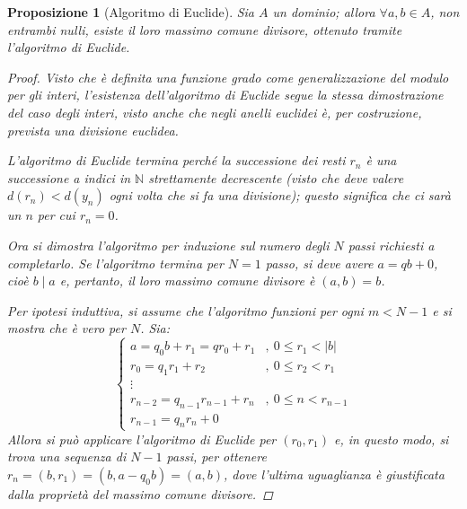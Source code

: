 \documentclass[12pt]{scrartcl}
\theoremstyle{style}
\newtheorem{prop}{Proposizione}[section]
\numberwithin{equation}{subsection}
\begin{document}
\begin{prop}
	[Algoritmo di Euclide]
	Sia $A$ un dominio; allora $\forall a,b \in A$, non entrambi nulli, esiste il loro massimo comune divisore, ottenuto tramite l'algoritmo di Euclide.
	\begin{proof}
		Visto che \`e definita una funzione grado come generalizzazione del modulo per gli interi, l'esistenza dell'algoritmo di Euclide segue la stessa dimostrazione del caso degli interi, visto anche che negli anelli euclidei \`e, per costruzione, prevista una divisione euclidea.

		L'algoritmo di Euclide termina perch\'e la successione dei resti $r_n$ \`e una successione a indici in $\mathbb{N}$ strettamente decrescente (visto che deve valere $d(r_n) < d(y_n)$ ogni volta che si fa una divisione); questo significa che ci sar\`a un $n$ per cui $r_n = 0$.

		Ora si dimostra l'algoritmo per induzione sul numero degli $N$ passi richiesti a completarlo.
		Se l'algoritmo termina per $N=1$ passo, si deve avere $a = qb + 0$, cio\`e $b \mid a$ e, pertanto, il loro massimo comune divisore \`e $(a,b) = b$.

		Per ipotesi induttiva, si assume che l'algoritmo funzioni per ogni $m < N-1$ e si mostra che \`e vero per $N$.
		Sia:
		\[
		\begin{cases}
			a = q_0b +r_1 = qr_0+r_1 &,\ 0\le r_1<\lvert b \rvert \\
			r_0 = q_1r_1 + r_2 &,\ 0\le r_2<r_1\\
			\vdots\\
			r_{n-2} =q_{n-1} r_{n-1} +r_n &,\ 0\le n < r_{n-1} \\
			r_{n-1} = q_nr_n + 0
		\end{cases}
		\] 
		Allora si pu\`o applicare l'algoritmo di Euclide per $(r_0,r_1)$ e, in questo modo, si trova una sequenza di $N-1$ passi, per ottenere $r _ n =(b,r_1)=(b,a-q_0b)=(a,b)$, dove l'ultima uguaglianza \`e giustificata dalla propriet\`a del massimo comune divisore.
	\end{proof}
\end{prop}
\end{document}
